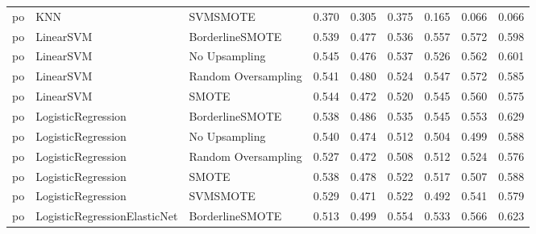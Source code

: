 \begin{tabular}{lllllllll}
      po &                          KNN &            SVMSMOTE & 0.370 &                     0.305 &                 0.375 &                  0.165 &                                   0.066 &     0.066 \\
      po &                    LinearSVM &     BorderlineSMOTE & 0.539 &                     0.477 &                 0.536 &                  0.557 &                                   0.572 &     0.598 \\
      po &                    LinearSVM &       No Upsampling & 0.545 &                     0.476 &                 0.537 &                  0.526 &                                   0.562 &     0.601 \\
      po &                    LinearSVM & Random Oversampling & 0.541 &                     0.480 &                 0.524 &                  0.547 &                                   0.572 &     0.585 \\
      po &                    LinearSVM &               SMOTE & 0.544 &                     0.472 &                 0.520 &                  0.545 &                                   0.560 &     0.575 \\
      po &           LogisticRegression &     BorderlineSMOTE & 0.538 &                     0.486 &                 0.535 &                  0.545 &                                   0.553 &     0.629 \\
      po &           LogisticRegression &       No Upsampling & 0.540 &                     0.474 &                 0.512 &                  0.504 &                                   0.499 &     0.588 \\
      po &           LogisticRegression & Random Oversampling & 0.527 &                     0.472 &                 0.508 &                  0.512 &                                   0.524 &     0.576 \\
      po &           LogisticRegression &               SMOTE & 0.538 &                     0.478 &                 0.522 &                  0.517 &                                   0.507 &     0.588 \\
      po &           LogisticRegression &            SVMSMOTE & 0.529 &                     0.471 &                 0.522 &                  0.492 &                                   0.541 &     0.579 \\
      po & LogisticRegressionElasticNet &     BorderlineSMOTE & 0.513 &                     0.499 &                 0.554 &                  0.533 &                                   0.566 &     0.623 \\

\end{tabular}
